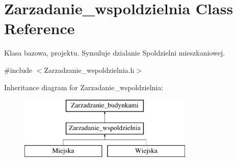 \hypertarget{class_zarzadanie__wspoldzielnia}{}\section{Zarzadanie\+\_\+wspoldzielnia Class Reference}
\label{class_zarzadanie__wspoldzielnia}


Klasa bazowa, projektu. Symuluje dzialanie Spoldzielni mieszkaniowej.  




{\ttfamily \#include $<$Zarzadzanie\+\_\+wspoldzielnia.\+h$>$}

Inheritance diagram for Zarzadanie\+\_\+wspoldzielnia\+:\begin{figure}[H]
\begin{center}
\leavevmode
\includegraphics[height=3.000000cm]{class_zarzadanie__wspoldzielnia}
\end{center}
\end{figure}
